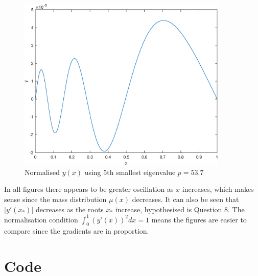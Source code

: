 \documentclass[10pt,a4paper,notitlepage]{article}
\newcommand{\abs}[1]{\lvert#1\rvert}
\begin{document}
\begin{figure}[H]
\begin{center}
\includegraphics[width=10cm]{Image_9_5}
\caption{Normalised $y(x)$ using 5th smallest eigenvalue $p=53.7$}\label{LFigure9}
\end{center}
\end{figure}
In all figures there appears to be greater oscillation as $x$ increases, which makes sense since the mass distribution $\mu (x)$ decreases. It can also be seen that $\abs{y'(x_{*})}$ decreases as the roots $x_{*}$ increase, hypothesised is Question 8. The normalisation condition $\int_{0}^{1}\left(y'(x)\right)^{2}dx=1$ means the figures are easier to compare since the gradients are in proportion.





\pagebreak
\section*{\centering \large Code}
\end{document}
